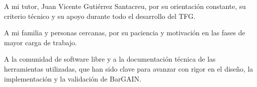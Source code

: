 
A mi tutor, Juan Vicente Guti\'errez Santacreu, por su orientaci\'on constante,
su criterio t\'ecnico y su apoyo durante todo el desarrollo del TFG.

A mi familia y personas cercanas, por su paciencia y motivaci\'on en las fases
de mayor carga de trabajo.

A la comunidad de software libre y a la documentaci\'on t\'ecnica de las
herramientas utilizadas, que han sido clave para avanzar con rigor en
el dise\~no, la implementaci\'on y la validaci\'on de BarGAIN.
